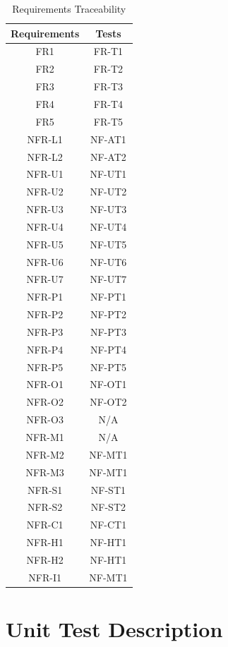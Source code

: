 \documentclass[12pt, titlepage]{article}
\begin{document}
\begin{table}[H]
	\centering
	\caption{Requirements Traceability}
	\label{my-label}
	\begin{tabular}{|c|c|}
		\hline
		\textbf{Requirements} & \textbf{Tests} \\ \hline
		FR1 & FR-T1 \\ \hline
		FR2 & FR-T2 \\ \hline
		FR3 & FR-T3 \\ \hline
		FR4 & FR-T4 \\ \hline
		FR5 & FR-T5 \\ \hline
		NFR-L1 & NF-AT1 \\ \hline
    NFR-L2 & NF-AT2 \\ \hline
    NFR-U1 & NF-UT1 \\ \hline
    NFR-U2 & NF-UT2 \\ \hline
    NFR-U3 & NF-UT3 \\ \hline
    NFR-U4 & NF-UT4 \\ \hline
    NFR-U5 & NF-UT5\\ \hline
    NFR-U6 & NF-UT6 \\ \hline
    NFR-U7 & NF-UT7 \\ \hline
    NFR-P1 & NF-PT1 \\ \hline
    NFR-P2 & NF-PT2 \\ \hline
    NFR-P3 & NF-PT3 \\ \hline
    NFR-P4 & NF-PT4 \\ \hline
    NFR-P5 & NF-PT5 \\ \hline
    NFR-O1 & NF-OT1 \\ \hline
    NFR-O2 & NF-OT2 \\ \hline
    NFR-O3 & N/A \\ \hline
    NFR-M1 & N/A \\ \hline
    NFR-M2 & NF-MT1 \\ \hline
    NFR-M3 & NF-MT1 \\ \hline
    NFR-S1 & NF-ST1 \\ \hline
    NFR-S2 & NF-ST2 \\ \hline
    NFR-C1 & NF-CT1 \\ \hline
    NFR-H1 & NF-HT1 \\ \hline
    NFR-H2 & NF-HT1 \\ \hline
    NFR-I1 & NF-MT1 \\ \hline
	\end{tabular}
\end{table}


\section{Unit Test Description}
\end{document}
